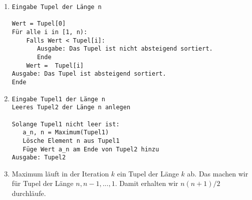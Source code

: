 \begin{enumerate}
\item \begin{verbatim}
Eingabe Tupel der Länge n

Wert = Tupel[0]
Für alle i in [1, n):
    Falls Wert < Tupel[i]:
       Ausgabe: Das Tupel ist nicht absteigend sortiert.
       Ende
    Wert =  Tupel[i]
Ausgabe: Das Tupel ist absteigend sortiert.
Ende
\end{verbatim}
	
\item \begin{verbatim}
Eingabe Tupel1 der Länge n
Leeres Tupel2 der Länge n anlegen

Solange Tupel1 nicht leer ist:
   a_n, n = Maximum(Tupel1)
   Lösche Element n aus Tupel1
   Füge Wert a_n am Ende von Tupel2 hinzu	
Ausgabe: Tupel2
\end{verbatim}
	
	\item Maximum läuft in der Iteration $k$ ein Tupel der Länge $k$ ab. Das machen wir für Tupel der Länge $n, n-1, ..., 1$. Damit erhalten wir
	$n(n+1)/2$ durchläufe. 
\end{enumerate}